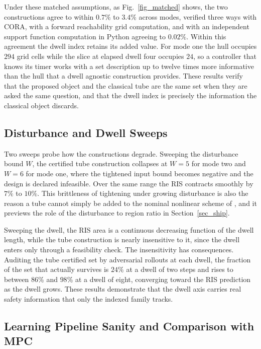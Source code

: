 \documentclass[journal]{IEEEtran}
\begin{document}
Under these matched assumptions, as Fig.~\ref{fig_matched} shows, the two constructions agree to within $0.7\%$ to $3.4\%$ across modes, verified three ways with CORA, with a forward reachability grid computation, and with an independent support function computation in Python agreeing to $0.02\%$. Within this agreement the dwell index retains its added value. For mode one the hull occupies $294$ grid cells while the slice at elapsed dwell four occupies $24$, so a controller that knows its timer works with a set description up to twelve times more informative than the hull that a dwell agnostic construction provides. These results verify that the proposed object and the classical tube are the same set when they are asked the same question, and that the dwell index is precisely the information the classical object discards.

\subsection{Disturbance and Dwell Sweeps}

Two sweeps probe how the constructions degrade. Sweeping the disturbance bound $W$, the certified tube construction collapses at $W = 5$ for mode two and $W = 6$ for mode one, where the tightened input bound becomes negative and the design is declared infeasible. Over the same range the RIS contracts smoothly by $7\%$ to $10\%$. This brittleness of tightening under growing disturbance is also the reason a tube cannot simply be added to the nominal nonlinear scheme of \cite{chenlazar2022}, and it previews the role of the disturbance to region ratio in Section~\ref{sec_ship}.

Sweeping the dwell, the RIS area is a continuous decreasing function of the dwell length, while the tube construction is nearly insensitive to it, since the dwell enters only through a feasibility check. The insensitivity has consequences. Auditing the tube certified set by adversarial rollouts at each dwell, the fraction of the set that actually survives is $24\%$ at a dwell of two steps and rises to between $86\%$ and $98\%$ at a dwell of eight, converging toward the RIS prediction as the dwell grows. These results demonstrate that the dwell axis carries real safety information that only the indexed family tracks.

\subsection{Learning Pipeline Sanity and Comparison with MPC}
\end{document}
